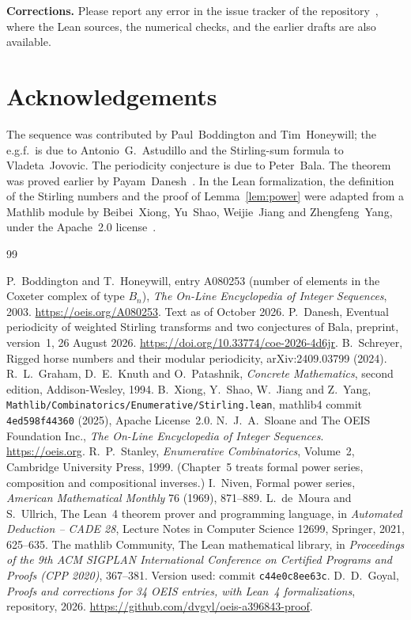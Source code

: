 \documentclass[11pt,a4paper]{article}
\theoremstyle{definition}
\theoremstyle{remark}
\newcommand{\para}[1]{\par\medskip\noindent\textbf{#1}\enspace}
\begin{document}
\para{Corrections.} Please report any error in the issue tracker of the repository~\cite{repo}, where the Lean
sources, the numerical checks, and the earlier drafts are also available.

\section*{Acknowledgements}
The sequence was contributed by Paul~Boddington and Tim~Honeywill; the e.g.f.\ is due to Antonio~G.~Astudillo and the Stirling-sum formula to Vladeta~Jovovic. The periodicity conjecture is due to Peter~Bala. The theorem was proved earlier by
Payam~Danesh~\cite{danesh}. In the Lean formalization, the definition of the Stirling numbers and the proof of
Lemma~\ref{lem:power} were adapted from a Mathlib module by Beibei~Xiong, Yu~Shao, Weijie~Jiang and Zhengfeng~Yang, under
the Apache~2.0 license~\cite{stirlingmathlib}.

\begin{thebibliography}{99}\small
\raggedright
{} P.~Boddington and T.~Honeywill, entry A080253 (number of elements in the Coxeter complex of type $B_n$), \emph{The On-Line Encyclopedia of Integer Sequences}, 2003. \url{https://oeis.org/A080253}. Text as of October 2026.
 P.~Danesh, Eventual periodicity of weighted Stirling transforms and two conjectures of Bala, preprint, version~1, 26 August 2026. \url{https://doi.org/10.33774/coe-2026-4d6jr}.
 B.~Schreyer, Rigged horse numbers and their modular periodicity, arXiv:2409.03799 (2024).
 R.~L.~Graham, D.~E.~Knuth and O.~Patashnik, \emph{Concrete Mathematics}, second edition, Addison-Wesley, 1994.
 B.~Xiong, Y.~Shao, W.~Jiang and Z.~Yang, \texttt{Mathlib/Combinatorics/Enumerative/Stirling.lean}, mathlib4 commit \texttt{4ed598f44360} (2025), Apache License~2.0.
 N.~J.~A.~Sloane and The OEIS Foundation Inc., \emph{The On-Line Encyclopedia of Integer Sequences}. \url{https://oeis.org}.
 R.~P.~Stanley, \emph{Enumerative Combinatorics}, Volume~2, Cambridge University Press, 1999. (Chapter~5 treats formal power series, composition and compositional inverses.)
 I.~Niven, Formal power series, \emph{American Mathematical Monthly} 76 (1969), 871--889.
 L.~de~Moura and S.~Ullrich, The Lean~4 theorem prover and programming language, in \emph{Automated Deduction -- CADE 28}, Lecture Notes in Computer Science 12699, Springer, 2021, 625--635.
 The mathlib Community, The Lean mathematical library, in \emph{Proceedings of the 9th ACM SIGPLAN International Conference on Certified Programs and Proofs (CPP 2020)}, 367--381. Version used: commit \texttt{c44e0c8ee63c}.
 D.~D.~Goyal, \emph{Proofs and corrections for 34 OEIS entries, with Lean~4 formalizations}, repository, 2026. \url{https://github.com/dvgyl/oeis-a396843-proof}.
\end{thebibliography}
\end{document}
